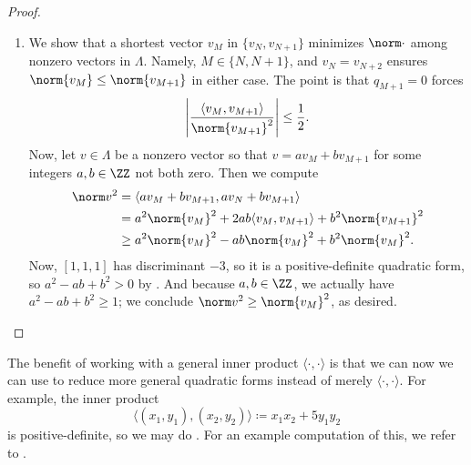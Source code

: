 \documentclass[../notes.tex]{subfiles}
\begin{document}
\begin{proof}
\begin{enumerate}
		\item We show that a shortest vector $v_M$ in $\{v_N,v_{N+1}\}$ minimizes $\norm\cdot$ among nonzero vectors in $\Lambda$. Namely, $M\in\{N,N+1\}$, and $v_N=v_{N+2}$ ensures $\norm{v_M}\le\norm{v_{M+1}}$ in either case. The point is that $q_{M+1}=0$ forces
		\[\left|\frac{\langle v_M,v_{M+1}\rangle}{\norm{v_{M+1}}^2}\right|\le\frac12.\]
		Now, let $v\in\Lambda$ be a nonzero vector so that $v=av_M+bv_{M+1}$ for some integers $a,b\in\ZZ$ not both zero. Then we compute
		\begin{align*}
			\norm v^2 &= \langle av_M+bv_{M+1},av_N+bv_{M+1}\rangle \\
			&= a^2\norm{v_M}^2+2ab\langle v_M,v_{M+1}\rangle+b^2\norm{v_{M+1}}^2 \\
			&\ge a^2\norm{v_M}^2-ab\norm{v_M}^2+b^2\norm{v_M}^2.
		\end{align*}
		Now, $[1,1,1]$ has discriminant $-3$, so it is a positive-definite quadratic form, so $a^2-ab+b^2>0$ by . And because $a,b\in\ZZ$, we actually have $a^2-ab+b^2\ge1$; we conclude $\norm v^2\ge\norm{v_M}^2$, as desired.
		\qedhere
	\end{enumerate}
\end{proof}
The benefit of working with a general inner product $\langle\cdot,\cdot\rangle$ is that we can now we can use  to reduce more general quadratic forms instead of merely $\langle\cdot,\cdot\rangle$. For example, the inner product
\[\langle(x_1,y_1),(x_2,y_2)\rangle\coloneqq x_1x_2+5y_1y_2\]
is positive-definite, so we may do . For an example computation of this, we refer to .
\end{document}

